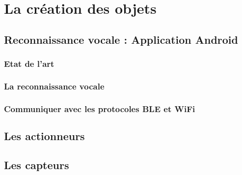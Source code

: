 \chapter{La création des objets}

\section{Reconnaissance vocale : Application Android}
	\subsection{Etat de l’art}
	\subsection{La reconnaissance vocale}
	\subsection{Communiquer avec les protocoles BLE et WiFi}
\section{Les actionneurs}
\section{Les capteurs}

